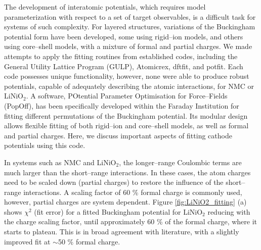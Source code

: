 \documentclass[journal=jacsat,manuscript=article]{achemso}
\begin{document}
The development of interatomic potentials, which requires model parameterization with respect to a set of target observables, is a difficult task for systems of such complexity.  
For layered structures, variations of the Buckingham potential form have been developed, some using rigid--ion models,\cite{Lewis_1985,Ledwaba2020,Sayle2005,Dawson2014} and others using core--shell models,\cite{Hart1998,Fisher2010,Lewis_1985,Ammundsen1999,Kerisit2014,He2019,Lee_and_Park_2012} with a mixture of formal and partial charges.
We made attempts to apply the fitting routines from established codes, including the General Utility Lattice Program (GULP),\cite{gale_gulp_1997} Atomicrex,\cite{Stukowski_2017} dftfit,\cite{dftfit} and potfit.\cite{wen_kim-compliant_2017} 
Each code possesses unique functionality, however, none were able to produce robust potentials, capable of adequately describing the atomic interactions, for NMC or LiNiO$_2$.
A software, POtential Parameter Optimisation for Force--Fields (PopOff),\cite{Morgan2021PopOff} has been specifically developed within the Faraday Institution for fitting different permutations of the Buckingham potential.
Its modular design allows flexible fitting of both rigid--ion and core--shell models, as well as formal and partial charges.
Here, we discuss important aspects of fitting cathode potentials using this code.

In systems such as NMC and LiNiO$_2$, the longer--range Coulombic terms are much larger than the short--range interactions.
In these cases, the atom charges need to be scaled down (partial charges) to restore the influence of the short--range interactions.
A scaling factor of 60 \% formal charge is commonly used,\cite{pedone2006potentials} however, partial charges are system dependent. 
Figure \ref{fig:LiNiO2_fitting} (a) shows $\chi^2$ (fit error) for a fitted Buckingham potential for LiNiO$_2$ reducing with the charge scaling factor, until approximately 60 \% of the formal charge, where it starts to plateau.
This is in broad agreement with literature, with a slightly improved fit at $\sim$50 \% formal charge.
\end{document}
